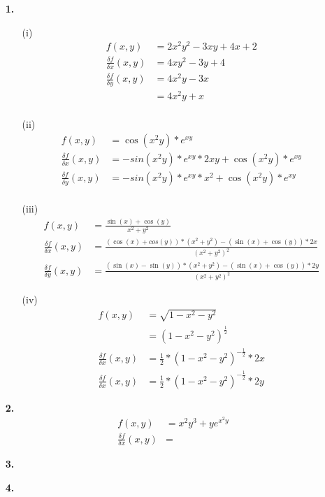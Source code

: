 \documentclass[a4paper,11pt,fleqn]{scrartcl}
\author{\authorinfo}
\title{\titleinfo}
\date{\today}
\begin{document}
\maketitle
\begin{enumerate}
    
\item[\textbf{1.}]
	\begin{itemize}
	\item[(i)]
		\begin{align*}
			f(x,y)&=2x^2y^2-3xy+4x+2\\
			\frac{\delta f}{\delta x}(x,y)&=4xy^2-3y+4\\
			\frac{\delta f}{\delta y}(x,y)&=4x^2y-3x\\
			&=4x^2y+x\\
		\end{align*}
	\item[(ii)]
		\begin{align*}
			f(x,y)&=\cos(x^2y)*e^{xy}\\
			\frac{\delta f}{\delta x}(x,y)&=-sin(x^2y)*e^{xy}*2xy+\cos(x^2y)*e^{xy}\\
			\frac{\delta f}{\delta y}(x,y)&=-sin(x^2y)*e^{xy}*x^2+\cos(x^2y)*e^{xy}\\
		\end{align*}
	\item[(iii)]
		\begin{align*}
			f(x,y)&=\frac{\sin(x)+\cos(y)}{x^2+y^2}\\
			\frac{\delta f}{\delta x}(x,y)&=\frac{ \left( \cos \left( x \right)+cos\left(y\right)\right)*\left(x^2+y^2\right)-\left(\sin(x)+\cos(y)\right)*2x }{\left(x^2+y^2\right)^2}\\
			\frac{\delta f}{\delta y}(x,y)&=\frac{\left(\sin (x)-\sin (y)\right)*\left(x^2+y^2\right)-\left(\sin(x)+\cos(y)\right)*2y}{\left(x^2+y^2\right)^2}
		\end{align*}
	\item[(iv)]
		\begin{align*}
			f(x,y)&=\sqrt{1-x^2-y^2}\\
			&=\left(1-x^2-y^2\right)^\frac{1}{2}\\
			\frac{\delta f}{\delta x}(x,y)&=\frac{1}{2}*\left(1-x^2-y^2\right)^{-\frac{1}{2}}*2x\\
			\frac{\delta f}{\delta x}(x,y)&=\frac{1}{2}*\left(1-x^2-y^2\right)^{-\frac{1}{2}}*2y
		\end{align*}
	\end{itemize}

\item[\textbf{2.}]
	\begin{align*}
		f(x,y)&=x^2y^3+ye^{x^2y}\\
		\frac{\delta f}{\delta x}(x,y)&=
	\end{align*}

\item[\textbf{3.}]
    

\item[\textbf{4.}]

\end{enumerate}
\end{document}

